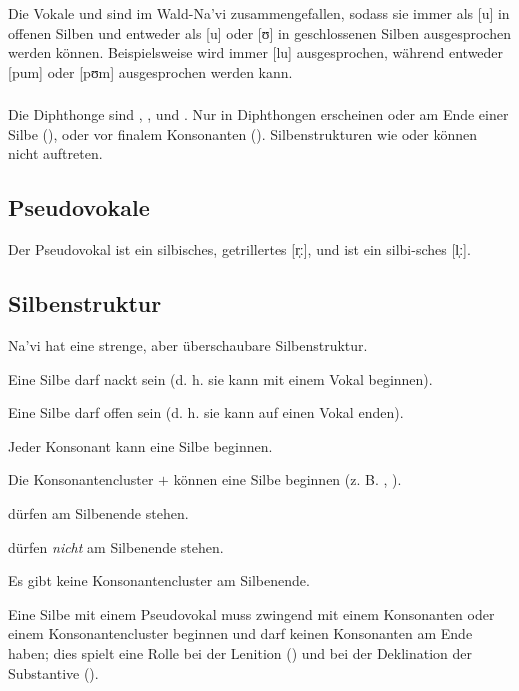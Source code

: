 \subsubsection{} Die Vokale  und  sind im Wald-Na'vi zusammengefallen, sodass sie immer als [u] in offenen Silben und entweder als [u] oder [ʊ] in geschlossenen Silben ausgesprochen werden können. Beispielsweise wird  immer [lu] ausgesprochen, während  entweder [pum] oder [pʊm] ausgesprochen werden kann.


\subsubsection{} Die Diphthonge sind , ,  und . Nur in  Diphthongen erscheinen  oder  am Ende einer Silbe (), oder vor finalem Konsonanten (). Silbenstrukturen wie  oder  können nicht auftreten.

\subsection{Pseudovokale} Der Pseudovokal  ist ein silbisches, getrillertes [r̩ː], und  ist ein silbi-sches [l̩ː].

\subsection{Silbenstruktur}
Na'vi hat eine strenge, aber überschaubare Silbenstruktur.

\begin{itemize*}
	\item Eine Silbe darf nackt sein (d. h. sie kann mit einem Vokal beginnen).
	\item Eine Silbe darf offen sein (d. h. sie kann auf einen Vokal enden).
	\item Jeder Konsonant kann eine Silbe beginnen.
	\item Die Konsonantencluster  $+$  können eine Silbe beginnen (z. B. , ).
	\item {} dürfen am Silbenende stehen.
	\item {} dürfen \textit{nicht} am Silbenende stehen.
	\item Es gibt keine Konsonantencluster am Silbenende.
	\item \label{lands:pseudo-no-null} Eine Silbe mit einem Pseudovokal muss zwingend mit einem Konsonanten oder einem Konsonantencluster beginnen und darf keinen Konsonanten am Ende haben; dies spielt eine Rolle bei der Lenition () und bei der Deklination der Substantive ().
\end{itemize*}

